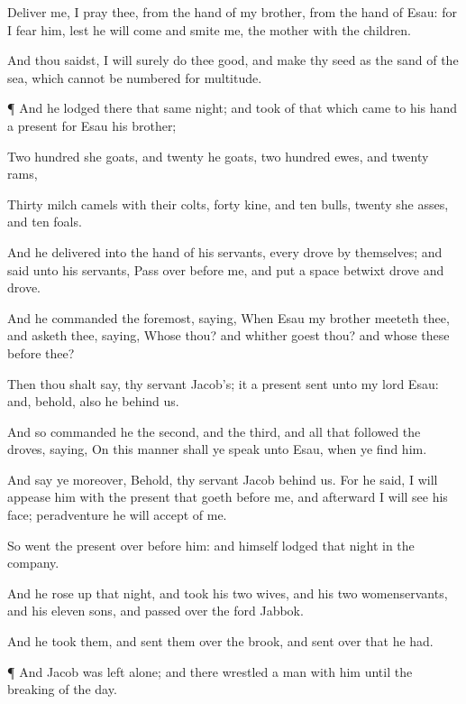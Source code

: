 {Deliver
me, I pray thee, from the
hand of my
brother, from the
hand of
Esau: for I
fear him, lest he will
come and smite
me,
{} the
mother
with the
children.

And thou
saidst, I will
surely do thee
good, and
make thy
seed as the
sand of the
sea, which cannot be
numbered for
multitude.


\par }{\PP {}¶ And he
lodged there that same
night; and
took of that which
came to his
hand a
present for
Esau his
brother;

Two
hundred she
goats, and
twenty he
goats, two
hundred
ewes, and
twenty
rams,

Thirty
milch
camels with their
colts,
forty
kine, and
ten
bulls,
twenty she
asses, and
ten
foals.

And he
delivered
{} into the
hand of his
servants, every
drove by themselves; and
said unto his
servants, Pass
over before
me, and
put a
space
betwixt
drove
and
drove.

And he
commanded the
foremost,
saying, When
Esau my
brother meeteth
thee, and asketh
thee,
saying, Whose
{} thou? and whither
goest thou? and whose
{} these
before thee?

Then thou shalt
say,
{} thy
servant
Jacob’s; it
{} a
present
sent unto my
lord
Esau: and, behold, also he
{} behind
us.

And
so commanded
he the
second, and the
third, and all that
followed the
droves,
saying, On this
manner shall ye
speak unto
Esau, when ye
find him.

And say
ye
moreover, Behold, thy
servant
Jacob
{} behind
us. For he
said, I will
appease
him with the
present that
goeth before
me, and
afterward I will
see his
face; peradventure he will
accept of
me.

So
went the
present
over before
him: and himself
lodged that
night in the
company.

And he rose
up that
night, and
took his
two
wives, and his
two
womenservants, and his
eleven
sons, and passed
over the
ford
Jabbok.

And he took
them, and sent them
over the
brook, and sent
over that he had.


\par }{\PP {}¶ And
Jacob was
left alone; and there
wrestled a
man with him until the
breaking of the
day.

}
